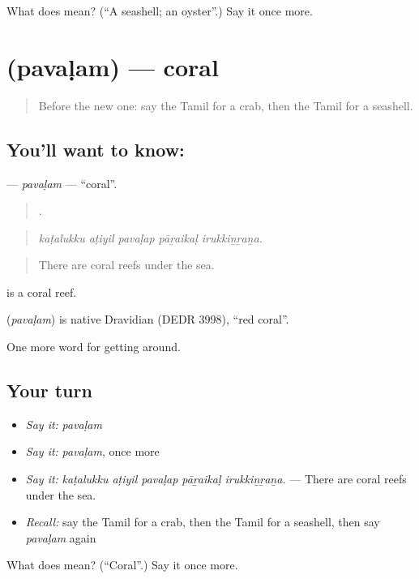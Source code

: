 \begin{tcolorbox}[breakable,colback=teal!4,colframe=teal!35!black,title={Before you move on}]
What does  mean? (\textquotedblleft{}A seashell; an oyster\textquotedblright{}.) Say it once more.
\end{tcolorbox}
\section[\texorpdfstring{\ta{பவளம்} (pavaḷam)}{பவளம் (pavaḷam)}]{ (pavaḷam) — coral}

\label{lesson:TA-C436-pavalam}



\begin{quote}
Before the new one: say the Tamil for a crab, then the Tamil for a seashell.
\end{quote}

\subsection*{You'll want to know: }
\textbf{} — \emph{pavaḷam} — \textquotedblleft{}coral\textquotedblright{}.

\begin{quote}
    .
\end{quote}

\begin{quote}
\emph{kaṭalukku aṭiyil pavaḷap pāṟaikaḷ irukkiṉṟaṉa.}
\end{quote}

\begin{quote}
There are coral reefs under the sea.
\end{quote}

  is a coral reef.

\begin{cousinweb}
\textbf{} (\emph{pavaḷam}) is native Dravidian (DEDR 3998), \textquotedblleft{}red coral\textquotedblright{}.
\end{cousinweb}

\begin{grammarlens}[title={What you've built}]
One more word for getting around.
\end{grammarlens}

\subsection*{Your turn}
\begin{itemize}
\raggedright
  \item \emph{Say it:} \emph{pavaḷam}
  \item \emph{Say it:} \emph{pavaḷam}, once more
  \item \emph{Say it:} \emph{kaṭalukku aṭiyil pavaḷap pāṟaikaḷ irukkiṉṟaṉa.} — There are coral reefs under the sea.
  \item \emph{Recall:} say the Tamil for a crab, then the Tamil for a seashell, then say \emph{pavaḷam} again
\end{itemize}

\begin{tcolorbox}[breakable,colback=teal!4,colframe=teal!35!black,title={Before you move on}]
What does  mean? (\textquotedblleft{}Coral\textquotedblright{}.) Say it once more.
\end{tcolorbox}
